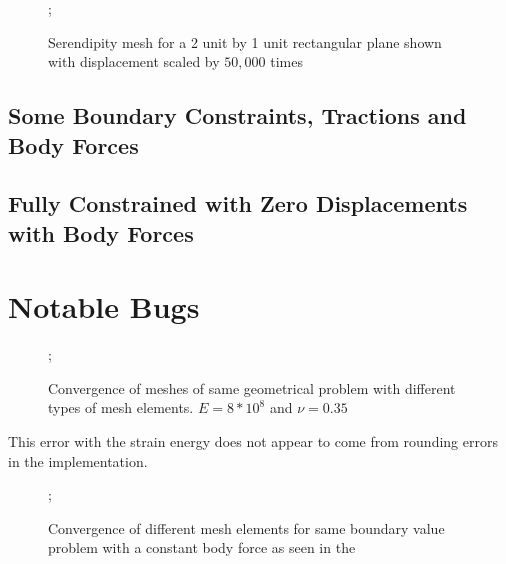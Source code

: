 \documentclass{article}
\begin{document}

\begin{figure}
    ;
    \caption{Serendipity mesh for a 2 unit by 1 unit rectangular plane shown with displacement scaled by $50,000$ times}
\centering
\end{figure}


\FloatBarrier

\subsection{Some Boundary Constraints, Tractions and Body Forces}

\subsection{Fully Constrained with Zero Displacements with Body Forces}


\section{Notable Bugs}

\FloatBarrier

\begin{figure}
    ;
    \caption{Convergence of meshes of same geometrical problem with different types of mesh elements. $E = 8*10^8$ and $\nu = 0.35$}
\centering
\end{figure}

This error with the strain energy does not appear to come from rounding errors in the implementation. 

\begin{figure}
    ;
    \caption{Convergence of different mesh elements for same boundary value problem with a constant body force as seen in the }
\centering
\end{figure}
\end{document}
